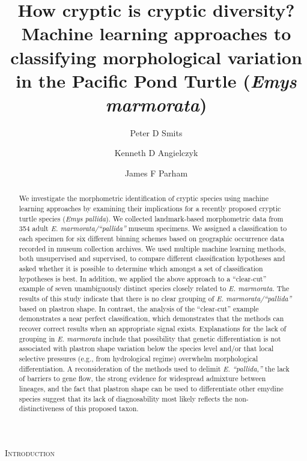 \documentclass[12pt,letterpaper]{article}
\title{How cryptic is cryptic diversity? Machine learning approaches to classifying morphological variation in the Pacific Pond Turtle (\textit{Emys marmorata})}
\author[1]{Peter D Smits}%
\author[1,2]{Kenneth D Angielczyk}%
\author[3]{James F Parham}%
\affil[1]{Committee on Evolutionary Biology, University of Chicago}
\affil[2]{Integrative Research Center, Field Museum of Natural History}
\affil[3]{Department of Geological Sciences, California State University -- Fullerton}
\renewcommand{\section}[1]{%
\bigskip
\begin{center}
\begin{Large}
\normalfont\scshape #1
\medskip
\end{Large}
\end{center}}
\begin{document}
\maketitle
{}

\linenumbers
\modulolinenumbers[2]

\begin{abstract}
  We investigate the morphometric identification of cryptic species using machine learning approaches by examining their implications for a recently proposed cryptic turtle species (\textit{Emys pallida}). We collected landmark-based morphometric data from 354 adult \textit{E. marmorata/``pallida''} museum specimens. We assigned a classification to each specimen for six different binning schemes based on geographic occurrence data recorded in museum collection archives. We used multiple machine learning methods, both unsupervised and supervised, to compare different classification hypotheses and asked whether it is possible to determine which amongst a set of classification hypotheses is best. In addition, we applied the above approach to a “clear-cut” example of seven unambiguously distinct species closely related to \textit{E. marmorata}. The results of this study indicate that there is no clear grouping of \textit{E. marmorata/``pallida''} based on plastron shape. In contrast, the analysis of the ``clear-cut'' example demonstrates a near perfect classification, which demonstrates that the methods can recover correct results when an appropriate signal exists. Explanations for the lack of grouping in \textit{E. marmorata} include that possibility that genetic differentiation is not associated with plastron shape variation below the species level and/or that local selective pressures (e.g., from hydrological regime) overwhelm morphological differentiation. A reconsideration of the methods used to delimit \textit{E. ``pallida,''} the lack of barriers to gene flow, the strong evidence for widespread admixture between lineages, and the fact that plastron shape can be used to differentiate other emydine species suggest that its lack of diagnosability most likely reflects the non-distinctiveness of this proposed taxon.
\end{abstract}

\section{Introduction}
\end{document}

